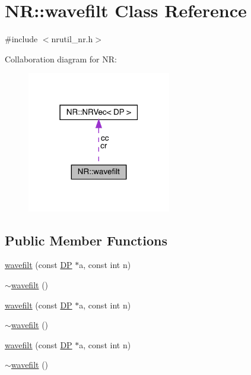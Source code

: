 \hypertarget{classNR_1_1wavefilt}{}\section{NR\+:\+:wavefilt Class Reference}
\label{classNR_1_1wavefilt}


{\ttfamily \#include $<$nrutil\+\_\+nr.\+h$>$}



Collaboration diagram for NR\+:\nopagebreak
\begin{figure}[H]
\begin{center}
\leavevmode
\includegraphics[width=178pt]{d6/d61/classNR_1_1wavefilt__coll__graph}
\end{center}
\end{figure}
\subsection*{Public Member Functions}
\begin{DoxyCompactItemize}
\item 
\mbox{\hyperlink{classNR_1_1wavefilt_aaa684e296af599915cdf4e0963b663c0}{wavefilt}} (const \mbox{\hyperlink{namespaceNR_af6ff762dd605ff477b8e52387253a02a}{DP}} $\ast$a, const int n)
\item 
\mbox{\hyperlink{classNR_1_1wavefilt_a9d223dd0fb637f3f511510b5efd9c6f6}{$\sim$wavefilt}} ()
\item 
\mbox{\hyperlink{classNR_1_1wavefilt_aaa684e296af599915cdf4e0963b663c0}{wavefilt}} (const \mbox{\hyperlink{namespaceNR_af6ff762dd605ff477b8e52387253a02a}{DP}} $\ast$a, const int n)
\item 
\mbox{\hyperlink{classNR_1_1wavefilt_a9d223dd0fb637f3f511510b5efd9c6f6}{$\sim$wavefilt}} ()
\item 
\mbox{\hyperlink{classNR_1_1wavefilt_aaa684e296af599915cdf4e0963b663c0}{wavefilt}} (const \mbox{\hyperlink{namespaceNR_af6ff762dd605ff477b8e52387253a02a}{DP}} $\ast$a, const int n)
\item 
\mbox{\hyperlink{classNR_1_1wavefilt_a9d223dd0fb637f3f511510b5efd9c6f6}{$\sim$wavefilt}} ()
\end{DoxyCompactItemize}
